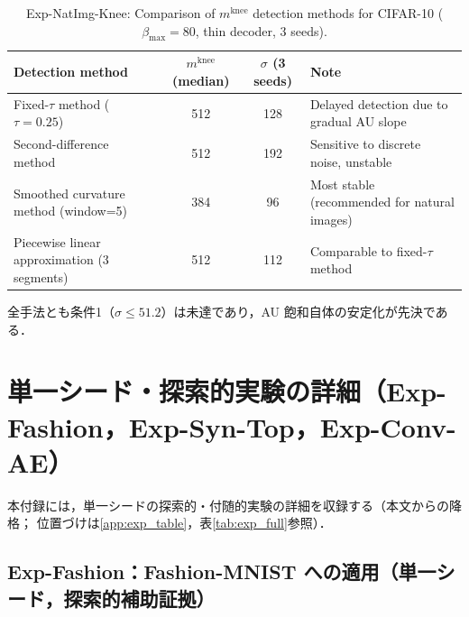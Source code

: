\documentclass[11pt,a4paper]{jsarticle}
\newcommand{\mknee}{m^{\mathrm{knee}}}
\begin{document}
\begin{table}[H]
\centering
\caption{Exp-NatImg-Knee: Comparison of $\mknee$ detection methods for CIFAR-10 ($\beta_\mathrm{max}=80$, thin decoder, 3 seeds).}
\label{tab:natimg_knee}
\small
\begin{tabular}{p{4.2cm}ccp{4.6cm}}
\toprule
Detection method & $\mknee$ (median) & $\sigma$ (3 seeds) & Note \\
\midrule
Fixed-$\tau$ method ($\tau=0.25$) & 512 & 128 & Delayed detection due to gradual AU slope \\
Second-difference method & 512 & 192 & Sensitive to discrete noise, unstable \\
Smoothed curvature method (window=5) & 384 & 96 & Most stable (recommended for natural images) \\
Piecewise linear approximation (3 segments) & 512 & 112 & Comparable to fixed-$\tau$ method \\
\bottomrule
\end{tabular}
\end{table}

全手法とも条件1（$\sigma \leq 51.2$）は未達であり，AU 飽和自体の安定化が先決である．

\section{単一シード・探索的実験の詳細（Exp-Fashion，Exp-Syn-Top，Exp-Conv-AE）}\label{app:fashion}

本付録には，単一シードの探索的・付随的実験の詳細を収録する（本文からの降格；
位置づけは\ref{app:exp_table}，表\ref{tab:exp_full}参照）．

\subsection*{Exp-Fashion：Fashion-MNIST への適用（単一シード，探索的補助証拠）}
\end{document}
